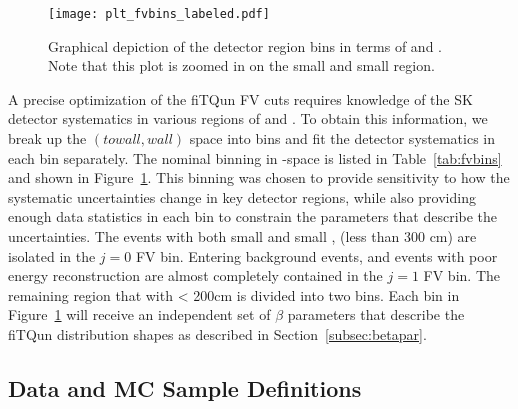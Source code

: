 \begin{figure}
  \begin{center}
    \texttt{[image: plt\_fvbins\_labeled.pdf]}
  \end{center}
  \caption{Graphical depiction of the detector region bins in terms of \wall
  and \towall.  Note that this plot is zoomed in on the small \wall and small
  \towall region.}
  \label{fig:fvbindef}
\end{figure}

A precise optimization of the fiTQun FV cuts requires knowledge of the SK
detector systematics in various regions of \wall and \towall.  To obtain this
information, we break up the $(towall,wall)$ space into bins and fit the
detector systematics in each bin separately.  The nominal binning in
\wall-\towall space is listed in Table~\ref{tab:fvbins} and shown in
Figure~\ref{fig:fvbindef}.  This binning was chosen to provide sensitivity to
how the systematic uncertainties change in key detector regions, while also
providing enough data statistics in each bin to constrain the parameters that
describe the uncertainties.  The events with both small \wall and small
\towall, (less than 300 cm) are isolated in the $j = 0$ FV bin.  Entering
background events, and events with poor energy reconstruction are almost
completely contained in the $j = 1$ FV bin.  The remaining region that with
\wall < 200cm is divided into two \towall bins.  Each bin in
Figure~\ref{fig:fvbindef} will receive an independent set of $\beta$ parameters
that describe the fiTQun distribution shapes as described in
Section~\ref{subsec:betapar}.




\subsection{Data and MC Sample Definitions}
\label{subsec:samples}

